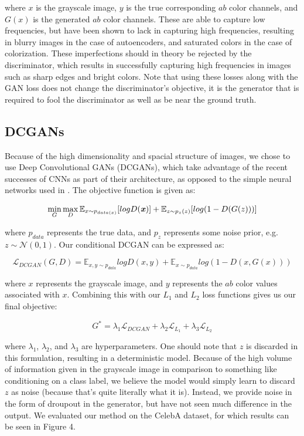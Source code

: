\documentclass[10pt]{article}
\begin{document}
\noindent where $x$ is the grayscale image, $y$ is the true corresponding $ab$ color channels, and $G(x)$ is the generated $ab$ color channels. 
These are able to capture low frequencies, but have been shown to lack in 
capturing high frequencies, resulting in blurry images in the case of autoencoders, and saturated colors in
the case of colorization. These imperfections should in theory be rejected by the discriminator, which
results in successfully capturing high frequencies in images such as sharp edges and bright colors. Note
that using these losses along with the GAN loss does not change the discriminator's objective, it is the
generator that is required to fool the discriminator as well as be near the ground truth.

\subsection{DCGANs}
Because of the high dimensionality and spacial structure of images, we chose to use Deep Convolutional GANs
(DCGANs), which take advantage of the recent successes of CNNs as part of their architecture, as opposed to the simple neural
networks used in \cite{goodfellow2014generative}. The objective function is given as:

\[\min\limits_{G}\max\limits_{D} \mathbb{E}_{x \sim p_{data(x)}} [logD(\textbf{\textit{x}})] + \mathbb{E}_{z \sim p_z(z)}[log(1 - D(G(z)))]\]

\noindent where $p_{data}$ represents the true data, and $p_z$ represents some noise prior, e.g.
$z \sim \mathcal{N}(0,1)$. Our conditional DCGAN can be expressed as:

\[ \mathcal{L}_{DCGAN}(G,D) = \mathbb{E}_{x,y \sim p_{data}} log D(x,y) + \mathbb{E}_{x \sim p_{data}}
log (1-D(x, G(x)))\]

\noindent where $x$ represents the grayscale image, and $y$ represents the $ab$ color values associated with
$x$. Combining this with our $L_1$ and $L_2$ loss functions gives us our final objective:

\[ G^* = \lambda_1 \mathcal{L}_{DCGAN} + \lambda_2 \mathcal{L}_{L_1} + \lambda_3 \mathcal{L}_{L_2} \]

\noindent where $\lambda_1$, $\lambda_2$, and $\lambda_3$ are hyperparameters. One should note that $z$
is discarded in this formulation, resulting in a deterministic model. Because of the high volume of information
given in the grayscale image in comparison to something like
conditioning on a class label, we believe the model would simply learn to discard $z$ as noise
(because that's quite literally what it is). Instead, we provide noise in the form of droupout in the
generator, but have not seen much difference in the output. We evaluated our method on the CelebA
dataset, for which results can be seen in Figure 4. 
\end{document}

